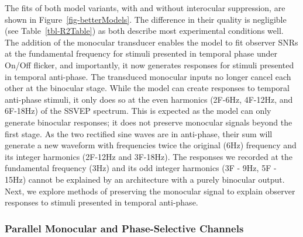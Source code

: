 \documentclass[
  12pt,
]{article}
\begin{document}
The fits of both model variants, with and without interocular
suppression, are shown in Figure~\ref{fig-betterModels}. The difference
in their quality is negligible (see Table~\ref{tbl-R2Table}) as both
describe most experimental conditions well. The addition of the
monocular transducer enables the model to fit observer SNRs at the
fundamental frequency for stimuli presented in temporal phase under
On/Off flicker, and importantly, it now generates responses for stimuli
presented in temporal anti-phase. The transduced monocular inputs no
longer cancel each other at the binocular stage. While the model can
create responses to temporal anti-phase stimuli, it only does so at the
even harmonics (2F-6Hz, 4F-12Hz, and 6F-18Hz) of the SSVEP spectrum.
This is expected as the model can only generate binocular responses; it
does not preserve monocular signals beyond the first stage. As the two
rectified sine waves are in anti-phase, their sum will generate a new
waveform with frequencies twice the original (6Hz) frequency and its
integer harmonics (2F-12Hz and 3F-18Hz). The responses we recorded at
the fundamental frequency (3Hz) and its odd integer harmonics (3F - 9Hz,
5F - 15Hz) cannot be explained by an architecture with a purely
binocular output. Next, we explore methods of preserving the monocular
signal to explain observer responses to stimuli presented in temporal
anti-phase.

\subsubsection{Parallel Monocular and Phase-Selective
Channels}\label{parallel-monocular-and-phase-selective-channels}
\end{document}
